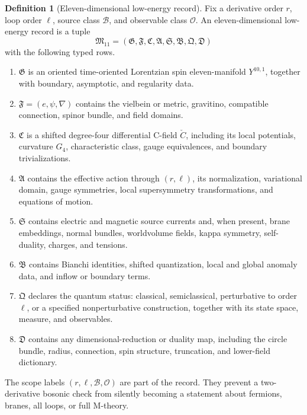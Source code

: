 \documentclass[11pt]{article}
\theoremstyle{definition}
\newtheorem{definition}[theorem]{Definition}
\theoremstyle{remark}
\newcommand{\cB}{\mathcal B}
\newcommand{\cO}{\mathcal O}
\begin{document}
\begin{definition}[Eleven-dimensional low-energy record]
\label{def:record}
Fix a derivative order \(r\), loop order \(\ell\), source class \(\cB\), and
observable class \(\cO\).  An eleven-dimensional low-energy record is a tuple
\[
\mathfrak M_{11}=
(\mathfrak G,\mathfrak F,\mathfrak C,\mathfrak A,
 \mathfrak S,\mathfrak B,\mathfrak Q,\mathfrak D)
\]
with the following typed rows.
\begin{enumerate}[leftmargin=1.7em]
\item \(\mathfrak G\) is an oriented time-oriented Lorentzian spin
      eleven-manifold \(Y^{10,1}\), together with boundary, asymptotic, and
      regularity data.
\item \(\mathfrak F=(e,\psi,\nabla)\) contains the vielbein or metric,
      gravitino, compatible connection, spinor bundle, and field domains.
\item \(\mathfrak C\) is a shifted degree-four differential C-field
      \(\check C\), including its local potentials, curvature \(G_4\),
      characteristic class, gauge equivalences, and boundary
      trivializations.
\item \(\mathfrak A\) contains the effective action through \((r,\ell)\),
      its normalization, variational domain, gauge symmetries, local
      supersymmetry transformations, and equations of motion.
\item \(\mathfrak S\) contains electric and magnetic source currents and,
      when present, brane embeddings, normal bundles, worldvolume fields,
      kappa symmetry, self-duality, charges, and tensions.
\item \(\mathfrak B\) contains Bianchi identities, shifted quantization,
      local and global anomaly data, and inflow or boundary terms.
\item \(\mathfrak Q\) declares the quantum status: classical, semiclassical,
      perturbative to order \(\ell\), or a specified nonperturbative
      construction, together with its state space, measure, and
      observables.
\item \(\mathfrak D\) contains any dimensional-reduction or duality map,
      including the circle bundle, radius, connection, spin structure,
      truncation, and lower-field dictionary.
\end{enumerate}
\end{definition}

The scope labels \((r,\ell,\cB,\cO)\) are part of the record.  They prevent a
two-derivative bosonic check from silently becoming a statement about
fermions, branes, all loops, or full M-theory.
\end{document}
